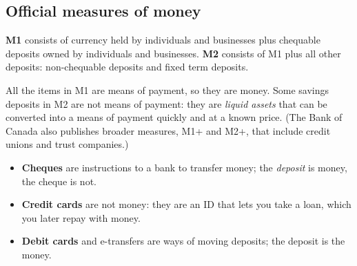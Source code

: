 \subsection{Official measures of money}

\begin{definition}[M1 and M2]
\textbf{M1} consists of currency held by individuals and businesses plus chequable
deposits owned by individuals and businesses. \textbf{M2} consists of M1 plus all other
deposits: non-chequable deposits and fixed term deposits.
\end{definition}

All the items in M1 are means of payment, so they are money. Some savings deposits in M2
are not means of payment: they are \emph{liquid assets} that can be converted into a means
of payment quickly and at a known price. (The Bank of Canada also publishes broader
measures, M1+ and M2+, that include credit unions and trust companies.)

\begin{center}
\end{center}

\begin{important}
\begin{itemize}
  \item \textbf{Cheques} are instructions to a bank to transfer money; the
        \emph{deposit} is money, the cheque is not.
  \item \textbf{Credit cards} are not money: they are an ID that lets you take a loan,
        which you later repay with money.
  \item \textbf{Debit cards} and e-transfers are ways of moving deposits; the deposit is
        the money.
\end{itemize}
\end{important}

